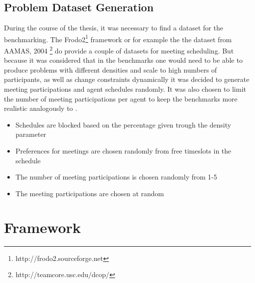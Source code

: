 \subsection{Problem Dataset Generation}

During the course of the thesis, it was necessary to find a dataset for the benchmarking. The Frodo2\footnote{http://frodo2.sourceforge.net} framework or for example the the dataset from AAMAS, 2004 \footnote{http://teamcore.usc.edu/dcop/} do provide a couple of datasets for meeting scheduling. But because it was considered that in the benchmarks one would need to be able to produce problems with different densities and scale to high numbers of participants, as well as change constraints dynamically it was decided to generate meeting participations and agent schedules randomly. It was also chosen to limit the number of meeting participations per agent to keep the benchmarks more realistic analogously to \cite{Chun}.

\begin{itemize}
\item Schedules are blocked based on the percentage given trough the density parameter
\item Preferences for meetings are chosen randomly from free timeslots in the schedule
\item The number of meeting participations is chosen randomly from 1-5
\item The meeting participations are chosen at random
\end{itemize}

\section{Framework}

